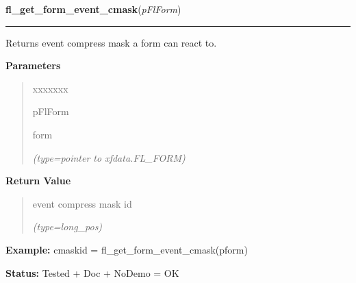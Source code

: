    \label{xformslib:flbasic:fl_get_form_event_cmask}

    \vspace{0.5ex}

\hspace{.8\funcindent}\begin{boxedminipage}{\funcwidth}

    \raggedright \textbf{fl\_get\_form\_event\_cmask}(\textit{pFlForm})

    \vspace{-1.5ex}

    \rule{\textwidth}{0.5\fboxrule}
\setlength{\parskip}{2ex}
    Returns event compress mask a form can react to.

\setlength{\parskip}{1ex}
      \textbf{Parameters}
      \vspace{-1ex}

      \begin{quote}
        \begin{Ventry}{xxxxxxx}

          \item[pFlForm]

          form

            {\it (type=pointer to xfdata.FL\_FORM)}

        \end{Ventry}

      \end{quote}

      \textbf{Return Value}
    \vspace{-1ex}

      \begin{quote}
      event compress mask id

      {\it (type=long\_pos)}

      \end{quote}

\textbf{Example:} cmaskid = fl\_get\_form\_event\_cmask(pform)



\textbf{Status:} Tested + Doc + NoDemo = OK



    \end{boxedminipage}

    \label{xformslib:flbasic:fl_set_form_geometry}


